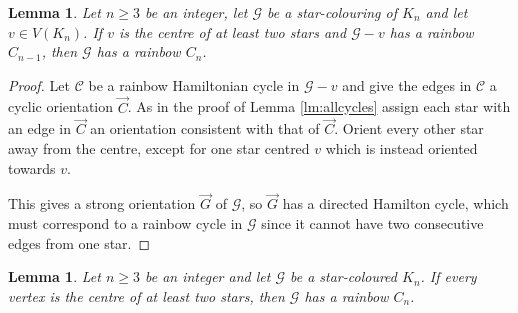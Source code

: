 \documentclass[a4paper, 12pt]{article}
\numberwithin{equation}{section}
\newtheorem{lemma}[theorem]{Lemma}
\newcommand{\ova}[1]{\overrightarrow{#1}}
\newcommand{\ms}[1]{\mathscr{#1}}
\begin{document}
\begin{lemma}\label{lm:ext}
Let $n \geq 3$ be an integer, let $\ms{G}$ be a star-colouring of $K_n$ and let $v\in V(K_n)$.
	If $v$ is the centre of at least two stars and $\ms{G}-v$ has a rainbow $C_{n-1}$, then $\ms{G}$ has a rainbow $C_n$. 
\end{lemma}
\begin{proof}
	Let $\ms{C}$ be a rainbow Hamiltonian cycle in  $\ms{G}-v$ and give the edges in $\ms{C}$ a cyclic orientation $\ova{C}$.  As in the proof of Lemma \ref{lm:allcycles} assign each star with an edge in $\ova{C}$ an orientation consistent with that of $\ova{C}$.  Orient every other star away from the centre, except for one star centred $v$ which is instead oriented towards $v$.
	
	This gives a strong orientation $\ova{G}$ of $\ms{G}$, so $\ova{G}$ has a directed Hamilton cycle, which must correspond to a rainbow cycle in $\ms{G}$ since it cannot have two consecutive edges from one star. 
\end{proof}

\begin{lemma}\label{lm:hamcycle}
Let $n \geq 3$ be an integer and let $\ms{G}$ be a star-coloured $K_n$.
	If every vertex is the centre of at least two stars, then $\ms{G}$ has a rainbow $C_n$. 
\end{lemma}
\end{document}
